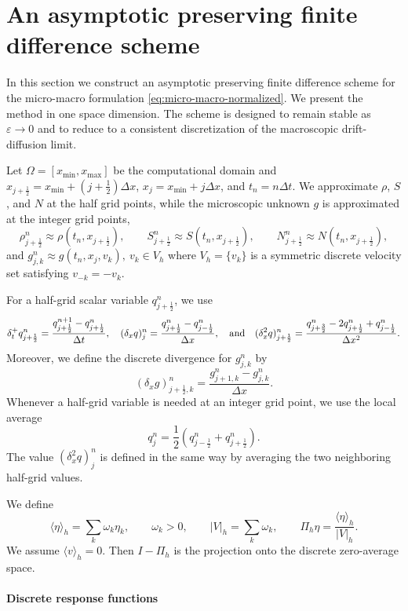 \documentclass[11pt,twoside]{article}
\numberwithin{equation}{section}
\theoremstyle{plain}
\theoremstyle{nonumberplain}
\begin{document}
{
\section{An asymptotic preserving finite difference scheme}
\label{sec:scheme}

In this section we construct an asymptotic preserving finite difference
scheme for the micro-macro formulation \eqref{eq:micro-macro-normalized}. We present the method in one space dimension. The scheme is
designed to remain stable as \(\varepsilon\to0\) and to reduce to a
consistent discretization of the macroscopic drift-diffusion limit.

Let $\Omega = [x_{\min}, x_{\max}]$ be the computational domain and \(x_{j+\frac12}=x_{\min}+(j+\frac12)\Delta x\),
\(x_j=x_{\min}+j\Delta x\), and \(t_n=n\Delta t\). We approximate
\(\rho\), \(S\), and \(N\) at the half grid points, while the microscopic
unknown \(g\) is approximated at the integer grid points,
\[
\rho_{j+\frac12}^n\approx \rho(t_n,x_{j+\frac12}),\qquad
S_{j+\frac12}^n\approx S(t_n,x_{j+\frac12}),\qquad
N_{j+\frac12}^n\approx N(t_n,x_{j+\frac12}),
\]
and $
g_{j,k}^n\approx g(t_n,x_j,v_k),\ v_k\in V_h $ where \(V_h=\{v_k\}\) is a symmetric discrete velocity set satisfying 
$v_{-k}=-v_k$.

For a half-grid scalar variable \(q_{j+\frac12}^n\), we use
\[
\delta_t^+ q_{j+\frac12}^n
=
\frac{q_{j+\frac12}^{n+1}-q_{j+\frac12}^n}{\Delta t},
\ \ \
(\delta_x q)_j^n
=
\frac{q_{j+\frac12}^n-q_{j-\frac12}^n}{\Delta x},\ \ \ \textnormal{and}\ \ \
(\delta_x^2 q)_{j+\frac12}^n
=
\frac{
q_{j+\frac32}^n
-2q_{j+\frac12}^n
+q_{j-\frac12}^n
}{\Delta x^2}.
\]
Moreover, we define the discrete divergence for \(g_{j,k}^n\) by
\[
(\delta_x g)_{j+\frac12,k}^n
=
\frac{g_{j+1,k}^n-g_{j,k}^n}{\Delta x}.
\]
Whenever a half-grid variable is needed at an integer grid point, we use
the local average
\[
q_j^n=\frac12\left(q_{j-\frac12}^n+q_{j+\frac12}^n\right).
\]
The value \((\delta_x^2 q)_j^n\) is defined in the same way by averaging
the two neighboring half-grid values.


We define
\[
\langle \eta\rangle_h=\sum_{k}\omega_k\eta_k,
\qquad \omega_k>0,
\qquad |V|_h=\sum_{k}\omega_k,
\qquad \Pi_h\eta=\frac{\langle\eta\rangle_h}{|V|_h}.
\]
We assume $\langle v\rangle_h=0$. Then $I-\Pi_h$ is the
projection onto the discrete zero-average space.


\paragraph{Discrete response functions}

}
\end{document}

